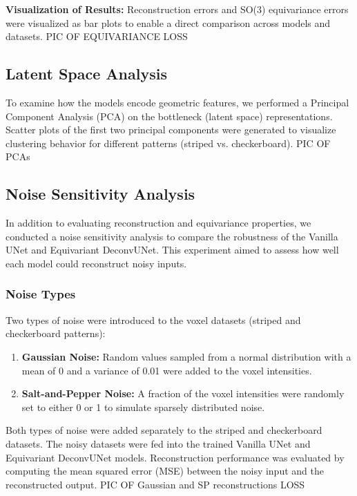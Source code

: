\documentclass[letterpaper]{article}
\begin{document}
\textbf{Visualization of Results:} 
Reconstruction errors and SO(3) equivariance errors were visualized as bar plots to enable a direct comparison across models and datasets.
\newline PIC OF EQUIVARIANCE LOSS

\subsection{Latent Space Analysis}
To examine how the models encode geometric features, we performed a Principal Component Analysis (PCA) on the bottleneck (latent space) representations. Scatter plots of the first two principal components were generated to visualize clustering behavior for different patterns (striped vs. checkerboard).
PIC OF PCAs
\subsection{Noise Sensitivity Analysis}
In addition to evaluating reconstruction and equivariance properties, we conducted a noise sensitivity analysis to compare the robustness of the Vanilla UNet and Equivariant DeconvUNet. This experiment aimed to assess how well each model could reconstruct noisy inputs.

\subsubsection{Noise Types}
Two types of noise were introduced to the voxel datasets (striped and checkerboard patterns):
\begin{enumerate}
    \item \textbf{Gaussian Noise:} Random values sampled from a normal distribution with a mean of 0 and a variance of 0.01 were added to the voxel intensities.
    \item \textbf{Salt-and-Pepper Noise:} A fraction of the voxel intensities were randomly set to either 0 or 1 to simulate sparsely distributed noise.
\end{enumerate}

Both types of noise were added separately to the striped and checkerboard datasets. The noisy datasets were fed into the trained Vanilla UNet and Equivariant DeconvUNet models. Reconstruction performance was evaluated by computing the mean squared error (MSE) between the noisy input and the reconstructed output.
\newline PIC OF Gaussian and SP reconstructions LOSS
\end{document}
